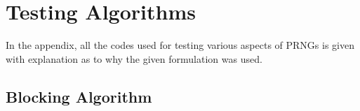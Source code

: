 \appendix
\chapter{Testing Algorithms}
In the appendix, all the codes used for testing various 
aspects of PRNGs is given with explanation as to why the 
given formulation was used.

\section{Blocking Algorithm}
